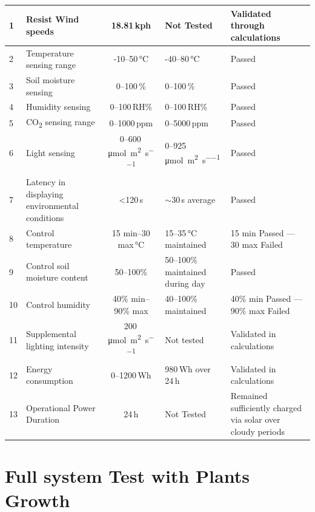 \begin{ThreePartTable}
\begin{longtable}{|p{1.5cm}|p{4.4cm}|c|p{3cm}|p{3cm}|}
		1  & Resist Wind speeds                                  & 18.81\,kph & Not Tested           & Validated through calculations \\ \hline
		2  & Temperature sensing range                           & -10--50\,°C & -40--80\,°C          & Passed \\ \hline
		3  & Soil moisture sensing                               & 0--100\,\% & 0--100\,\%           & Passed \\ \hline
		4  & Humidity sensing                                    & 0--100\,RH\% & 0--100\,RH\%        & Passed \\ \hline
		5  & CO\textsubscript{2} sensing range                   & 0--1000\,ppm & 0--5000\,ppm        & Passed \\ \hline
		6  & Light sensing                                       & 0--600\,\si{\micro\mole\per\metre\squared\per\second} & 0--925\,\si{\micro\mole\per\metre\squared\per\second} & Passed \\ \hline
		7  & Latency in displaying environmental conditions      & <120\,s     & $\sim$30\,s average  & Passed \\ \hline
		8  & Control temperature                                 & 15 min--30 max\,°C & 15--35\,°C maintained & 15 min Passed — 30 max Failed \\ \hline
		9  & Control soil moisture content                       & 50--100\% & 50--100\% maintained during day & Passed \\ \hline
		10 & Control humidity                                    & 40\% min--90\% max & 40--100\% maintained & 40\% min Passed — 90\% max Failed \\ \hline
		11 & Supplemental lighting intensity                     & 200\,\si{\micro\mole\per\metre\squared\per\second} & Not tested           & Validated in calculations \\ \hline
		12 & Energy consumption                                  & 0--1200\,Wh & 980\,Wh over 24\,h   & Validated in calculations \\ \hline
		13 & Operational Power Duration                           & 24\,h      & Not Tested            & Remained sufficiently charged via solar over cloudy periods \\ \hline
		
	\end{longtable}
\end{ThreePartTable}


\section{Full system Test with Plants Growth}

